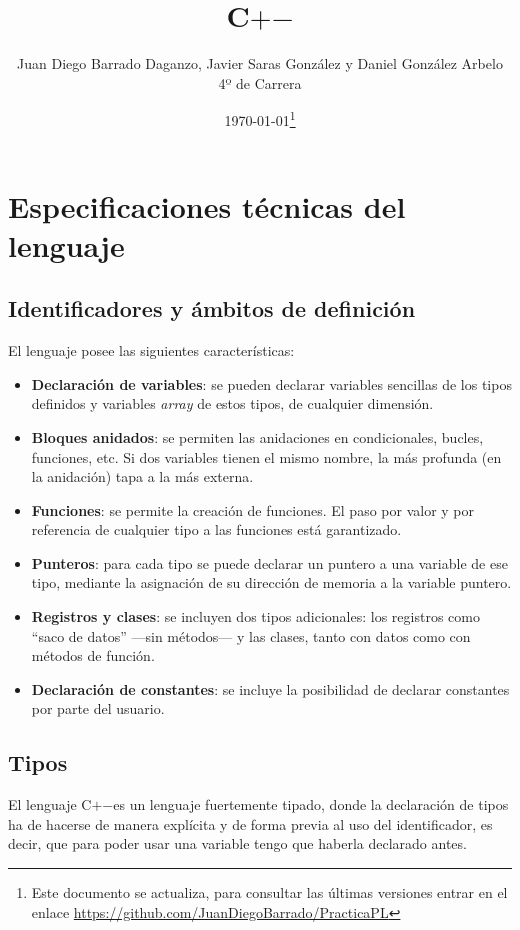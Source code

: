 \documentclass[10pt,a4paper]{article}
\title{\Huge C$+$$-$}
\author{Juan Diego Barrado Daganzo, Javier Saras González y Daniel González Arbelo \\ 4º de Carrera}
\date{\today\footnote{Este documento se actualiza, para consultar las últimas versiones entrar en el enlace \url{https://github.com/JuanDiegoBarrado/PracticaPL}}}
\newcommand{\cpm}{C$+$$-$}
\begin{document}
\maketitle
\tableofcontents

\section{Especificaciones técnicas del lenguaje}\label{sec:Especificaciones técnicas del lenguaje}
\subsection{Identificadores y ámbitos de definición}\label{subsec:Identificadores y ámbitos de definición}
El lenguaje posee las siguientes características:
\begin{itemize}
    \item \textbf{Declaración de variables}: se pueden declarar variables sencillas de los tipos definidos y variables \textit{array} de estos tipos, de cualquier dimensión.
    \item \textbf{Bloques anidados}: se permiten las anidaciones en condicionales, bucles, funciones, etc. Si dos variables tienen el mismo nombre, la más profunda (en la anidación) tapa a la más externa.
    \item \textbf{Funciones}: se permite la creación de funciones. El paso por valor y por referencia de cualquier tipo a las funciones está garantizado.
    \item \textbf{Punteros}: para cada tipo se puede declarar un puntero a una variable de ese tipo, mediante la asignación de su dirección de memoria a la variable puntero.
    \item \textbf{Registros y clases}: se incluyen dos tipos adicionales: los registros como ``saco de datos'' ---sin métodos--- y las clases, tanto con datos como con métodos de función.
    \item \textbf{Declaración de constantes}: se incluye la posibilidad de declarar constantes por parte del usuario.
\end{itemize}

\subsection{Tipos}\label{subsec:Tipos}
El lenguaje \cpm es un lenguaje fuertemente tipado, donde la declaración de tipos ha de hacerse de manera explícita y de forma previa al uso del identificador, es decir, que para poder usar una variable tengo que haberla declarado antes.
\end{document}
